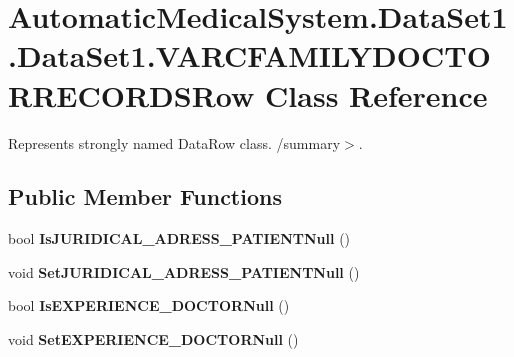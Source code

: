 \section{AutomaticMedicalSystem.DataSet1.DataSet1.VARCFAMILYDOCTORRECORDSRow Class Reference}
\label{class_automatic_medical_system_1_1_data_set1_1_1_v_a_r_c_f_a_m_i_l_y_d_o_c_t_o_r_r_e_c_o_r_d_s_row}
Represents strongly named DataRow class. /summary$>$.  


\subsection*{Public Member Functions}
\begin{CompactItemize}
\item 
bool \textbf{IsJURIDICAL\_\-ADRESS\_\-PATIENTNull} ()\label{class_automatic_medical_system_1_1_data_set1_1_1_v_a_r_c_f_a_m_i_l_y_d_o_c_t_o_r_r_e_c_o_r_d_s_row_c73d578d8f3cc2b8ef966a0d37d35d16}

\item 
void \textbf{SetJURIDICAL\_\-ADRESS\_\-PATIENTNull} ()\label{class_automatic_medical_system_1_1_data_set1_1_1_v_a_r_c_f_a_m_i_l_y_d_o_c_t_o_r_r_e_c_o_r_d_s_row_dac9681a1a1998b25a9895232d32c2a9}

\item 
bool \textbf{IsEXPERIENCE\_\-DOCTORNull} ()\label{class_automatic_medical_system_1_1_data_set1_1_1_v_a_r_c_f_a_m_i_l_y_d_o_c_t_o_r_r_e_c_o_r_d_s_row_ffe8bee1fbc54f59d545e575f7102176}

\item 
void \textbf{SetEXPERIENCE\_\-DOCTORNull} ()\label{class_automatic_medical_system_1_1_data_set1_1_1_v_a_r_c_f_a_m_i_l_y_d_o_c_t_o_r_r_e_c_o_r_d_s_row_f0a6963ec11ac1b5908e62840979ba0f}

\end{CompactItemize}
